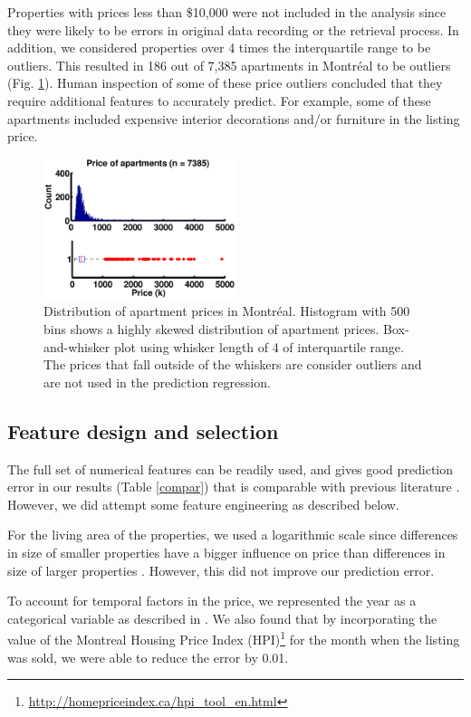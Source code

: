 \documentclass[conference]{IEEEtran}
\begin{document}
Properties with prices less than \$10,000 were not included in the analysis since they were likely to be errors in original data recording or the retrieval process. In addition, we considered properties over 4 times the interquartile range to be outliers. This resulted in 186 out of 7,385 apartments in Montr\'eal to be outliers (Fig. \ref{outlier}). Human inspection of some of these price outliers concluded that they require additional features to accurately predict. For example, some of these apartments included expensive interior decorations and/or furniture in the listing price.

\begin{figure}[H]
\centering
\includegraphics[width=0.5\textwidth]{outlier.eps}
\caption{\scriptsize Distribution of apartment prices in Montr\'eal. Histogram with 500 bins shows a highly skewed distribution of apartment prices. Box-and-whisker plot using whisker length of 4 of interquartile range. The prices that fall outside of the whiskers are consider outliers and are not used in the prediction regression.}
\label{outlier}
\end{figure}

\subsection{Feature design and selection}
The full set of numerical features can be readily used, and gives good prediction error in our results (Table \ref{compar}) that is comparable with previous literature \cite{SpatialDependence,RePEc:jre:issued:v:32:n:2:2010:p:139-160,Caplin08machinelearning}. However, we did attempt some feature engineering as described below.

For the living area of the properties, we used a logarithmic scale since differences in size of smaller properties have a bigger influence on price than differences in size of larger properties \cite{SpatialDependence}. However, this did not improve our prediction error.

To account for temporal factors in the price, we represented the year as a categorical variable as described in \cite{NBERw13553}. We also found that by incorporating the value of the Montreal Housing Price Index (HPI)\footnote{\url{http://homepriceindex.ca/hpi_tool_en.html}} for the month when the listing was sold, we were able to reduce the error by 0.01.
\end{document}
